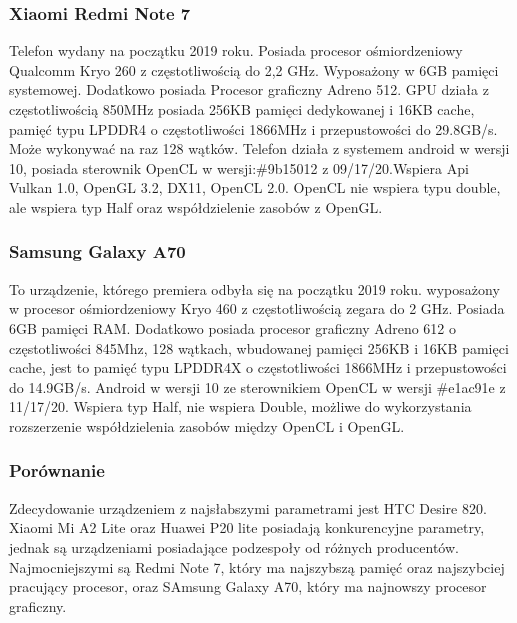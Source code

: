 \subsubsection[Xiaomi Redmi Note 7]{Xiaomi Redmi Note 7}
Telefon wydany na początku 2019 roku. Posiada procesor ośmiordzeniowy Qualcomm Kryo 260 z częstotliwością do 2,2 GHz. Wyposażony w 6GB pamięci systemowej. Dodatkowo posiada Procesor graficzny Adreno 512. GPU działa z częstotliwością 850MHz posiada 256KB pamięci dedykowanej i 16KB cache, pamięć typu LPDDR4 o częstotliwości 1866MHz i przepustowości do 29.8GB/s. Może wykonywać na raz 128 wątków. Telefon działa z systemem android w wersji 10, posiada sterownik OpenCL w wersji:\#9b15012 z 09/17/20.Wspiera Api Vulkan 1.0, OpenGL 3.2, DX11, OpenCL 2.0. OpenCL nie wspiera typu double, ale wspiera typ Half oraz współdzielenie zasobów z OpenGL.
\subsubsection[Samsung Galaxy A70]{Samsung Galaxy A70}
To urządzenie, którego premiera odbyła się na początku 2019 roku. wyposażony w procesor ośmiordzeniowy Kryo 460 z częstotliwością zegara do 2 GHz. Posiada 6GB pamięci RAM. Dodatkowo posiada procesor graficzny Adreno 612 o częstotliwości 845Mhz, 128 wątkach, wbudowanej pamięci 256KB i 16KB pamięci cache, jest to pamięć typu LPDDR4X o częstotliwości 1866MHz i przepustowości do 14.9GB/s. Android w wersji 10 ze sterownikiem OpenCL w wersji \#e1ac91e z 11/17/20. Wspiera typ Half, nie wspiera Double, możliwe do wykorzystania rozszerzenie współdzielenia zasobów między OpenCL i OpenGL.
\subsubsection[Porównanie]{Porównanie}
Zdecydowanie urządzeniem z najsłabszymi parametrami jest HTC Desire 820. Xiaomi Mi A2 Lite oraz Huawei P20 lite posiadają konkurencyjne parametry, jednak są urządzeniami posiadające podzespoły od różnych producentów. Najmocniejszymi są Redmi Note 7, który ma najszybszą pamięć oraz najszybciej pracujący procesor, oraz SAmsung Galaxy A70, który ma najnowszy procesor graficzny.



